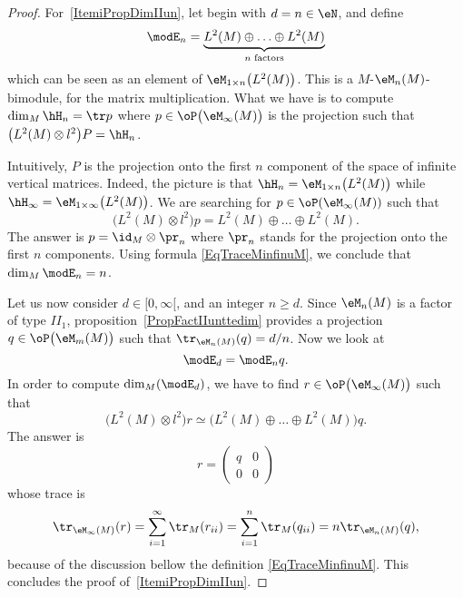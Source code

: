 \begin{proof}

	For~\ref{ItemiPropDimIIun}, let begin with $d=n\in \eN$, and define
	\begin{equation}
        \modE_n=\underbrace{  L^2(M)\oplus\ldots\oplus L^2(M)   }_{n \text{ factors}}
	\end{equation}
	which can be seen as an element of $\eM_{1\times n}\big( L^2(M) \big)$. This is a $M$-$\eM_n(M)$-bimodule, for the matrix multiplication. What we have is to compute $\dim_{M}\hH_n=\tr p$ where $p\in\oP\big( \eM_{\infty}(M) \big)$ is the projection such that $\big( L^2(M)\otimes l^2 \big)P=\hH_n$.

	Intuitively, $P$ is the projection onto the first $n$ component of the space of infinite vertical matrices. Indeed, the picture is that $\hH_n=\eM_{1\times n}\big( L^2(M) \big)$ while $\hH_{\infty}=\eM_{1\times \infty}\big( L^2(M) \big)$. We are searching for $p\in\oP(\eM_{\infty}(M))$ such that
	\begin{equation}
		\big( L^2(M)\otimes l^2 \big)p=L^2(M)\oplus\ldots\oplus L^2(M).
	\end{equation}
	The answer is $p=\id_{M}\otimes \pr_n$ where $\pr_n$ stands for the projection onto the first $n$ components. Using formula \eqref{EqTraceMinfinuM}, we conclude that $\dim_M\modE_n=n$.

	Let us now consider $d\in[0,\infty[$, and an integer $n\geq d$. Since $\eM_n(M)$ is a factor of type $II_1$, proposition~\ref{PropFactIIunttedim} provides a projection $q\in\oP\big( \eM_m(M) \big)$ such that $\tr_{\eM_n(M)}(q)=d/n$. Now we look at
	\begin{equation}
		\modE_d=\modE_nq.
	\end{equation}
	In order to compute $\dim_M(\modE_d)$, we have to find $r\in\oP\big( \eM_{\infty}(M) \big)$ such that
	\begin{equation}
		\big( L^2(M)\otimes l^2 \big)r\simeq \big( L^2(M)\oplus\ldots\oplus L^2(M) \big)q.
	\end{equation}
	The answer is
	\begin{equation}
		r=
	\begin{pmatrix}
	  q	&	0	\\
	  0	&	0
	\end{pmatrix}
	\end{equation}
	whose trace is
	\begin{equation}
		\tr_{\eM_{\infty}(M)}(r)=\sum_{i=1}^{\infty}\tr_M(r_{ii})=\sum_{i=1}^n\tr_M(q_{ii})=n\tr_{\eM_n(M)}(q),
	\end{equation}
	because of the discussion bellow the definition \eqref{EqTraceMinfinuM}. This concludes the proof of~\ref{ItemiPropDimIIun}.


\end{proof}
